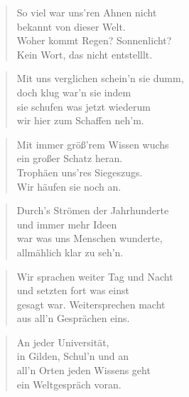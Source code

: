 \documentclass[10pt,a4paper]{article}
\begin{document}
\begin{paracol}{2}
\begin{verse}
So viel war uns’ren Ahnen nicht \\
bekannt von dieser Welt. \\
Woher kommt Regen? Sonnenlicht? \\
Kein Wort, das nicht entstelllt. \\
\end{verse}

\begin{verse}
Mit uns verglichen schein’n sie dumm, \\
doch klug war’n sie indem \\
sie schufen was jetzt wiederum \\
wir hier zum Schaffen neh’m. \\
\end{verse}

\begin{verse}
Mit immer größ’rem Wissen wuchs \\
ein großer Schatz heran. \\
Trophäen uns’res Siegeszugs. \\
Wir häufen sie noch an. \\
\end{verse}

\begin{verse}
Durch’s Strömen der Jahrhunderte \\
und immer mehr Ideen \\
war was uns Menschen wunderte, \\
allmählich klar zu seh’n. \\
\end{verse}

\begin{verse}
Wir sprachen weiter Tag und Nacht \\
und setzten fort was einst \\
gesagt war. Weitersprechen macht \\
aus all’n Gesprächen eins. \\
\end{verse}

\begin{verse}
An jeder Universität, \\
in Gilden, Schul’n und an \\
all’n Orten jeden Wissens geht \\
ein Weltgespräch voran. \\
\end{verse}


\end{paracol}
\end{document}
